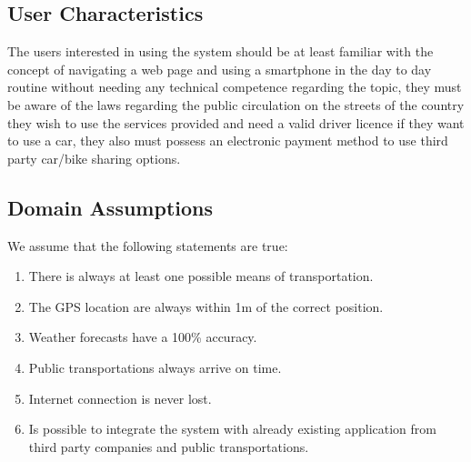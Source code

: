 \begin{samepage}
\subsection{User Characteristics}
The users interested in using the system should be at least familiar with the concept of navigating a web page and using a smartphone in the day to day routine without needing any technical competence regarding the topic, they must be aware of the laws regarding the public circulation on the streets of the country they wish to use the services provided and need a valid driver licence if they want to use a car, they also must possess an electronic payment method to use third party car/bike sharing options.
\par
\subsection{Domain Assumptions}
We assume that the following statements are true:
\begin{enumerate}
\item There is always at least one possible means of transportation.
\item The GPS location are always within 1m of the correct position.
\item Weather forecasts have a 100\% accuracy.
\item Public transportations always arrive on time.
\item Internet connection is never lost.
\item Is possible to integrate the system with already existing application from third party companies and public transportations.
\end{enumerate}
\end{samepage}